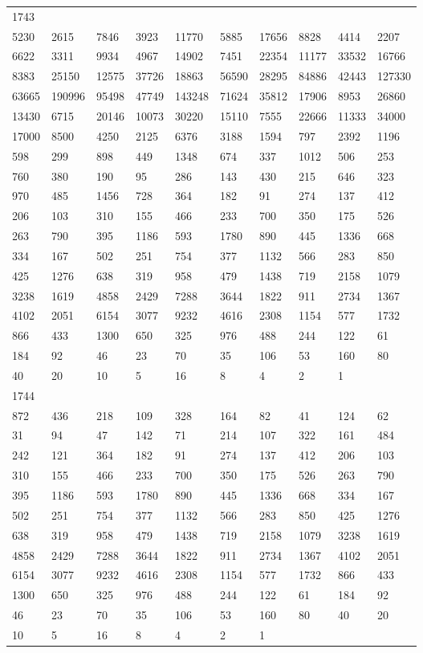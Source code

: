 \begin{longtable}{*{10}{l}}
1743&&&&&&&&&\\
5230& 2615& 7846& 3923& 11770& 5885& 17656& 8828& 4414& 2207\\
6622& 3311& 9934& 4967& 14902& 7451& 22354& 11177& 33532& 16766\\
8383& 25150& 12575& 37726& 18863& 56590& 28295& 84886& 42443& 127330\\
63665& 190996& 95498& 47749& 143248& 71624& 35812& 17906& 8953& 26860\\
13430& 6715& 20146& 10073& 30220& 15110& 7555& 22666& 11333& 34000\\
17000& 8500& 4250& 2125& 6376& 3188& 1594& 797& 2392& 1196\\
598& 299& 898& 449& 1348& 674& 337& 1012& 506& 253\\
760& 380& 190& 95& 286& 143& 430& 215& 646& 323\\
970& 485& 1456& 728& 364& 182& 91& 274& 137& 412\\
206& 103& 310& 155& 466& 233& 700& 350& 175& 526\\
263& 790& 395& 1186& 593& 1780& 890& 445& 1336& 668\\
334& 167& 502& 251& 754& 377& 1132& 566& 283& 850\\
425& 1276& 638& 319& 958& 479& 1438& 719& 2158& 1079\\
3238& 1619& 4858& 2429& 7288& 3644& 1822& 911& 2734& 1367\\
4102& 2051& 6154& 3077& 9232& 4616& 2308& 1154& 577& 1732\\
866& 433& 1300& 650& 325& 976& 488& 244& 122& 61\\
184& 92& 46& 23& 70& 35& 106& 53& 160& 80\\
40& 20& 10& 5& 16& 8& 4& 2& 1& \\

1744&&&&&&&&&\\
872& 436& 218& 109& 328& 164& 82& 41& 124& 62\\
31& 94& 47& 142& 71& 214& 107& 322& 161& 484\\
242& 121& 364& 182& 91& 274& 137& 412& 206& 103\\
310& 155& 466& 233& 700& 350& 175& 526& 263& 790\\
395& 1186& 593& 1780& 890& 445& 1336& 668& 334& 167\\
502& 251& 754& 377& 1132& 566& 283& 850& 425& 1276\\
638& 319& 958& 479& 1438& 719& 2158& 1079& 3238& 1619\\
4858& 2429& 7288& 3644& 1822& 911& 2734& 1367& 4102& 2051\\
6154& 3077& 9232& 4616& 2308& 1154& 577& 1732& 866& 433\\
1300& 650& 325& 976& 488& 244& 122& 61& 184& 92\\
46& 23& 70& 35& 106& 53& 160& 80& 40& 20\\
10& 5& 16& 8& 4& 2& 1& \\


\end{longtable}
